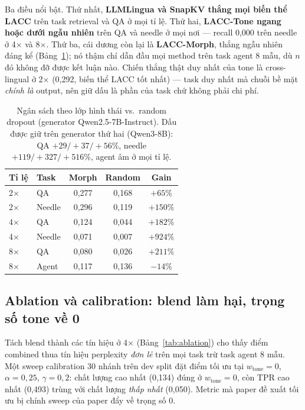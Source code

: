 \documentclass[runningheads]{llncs}
\newcommand{\method}[1]{\textsc{#1}}
\begin{document}
Ba điều nổi bật. Thứ nhất, \textbf{LLMLingua và SnapKV thắng mọi biến thể \method{LACC}} trên task retrieval và QA ở mọi tỉ lệ. Thứ hai, \textbf{LACC-Tone ngang hoặc dưới ngẫu nhiên} trên QA và needle ở mọi nơi --- recall 0,000 trên needle ở 4$\times$ và 8$\times$. Thứ ba, cái dương còn lại là \textbf{LACC-Morph}, thắng ngẫu nhiên đáng kể (Bảng~\ref{tab:morph}); nó thậm chí dẫn đầu mọi method trên task agent 8 mẫu, dù $n$ đó không đỡ được kết luận nào. Chiến thắng thật duy nhất của tone là cross-lingual ở 2$\times$ (0,292, biến thể \method{LACC} tốt nhất) --- task duy nhất mà chuỗi bề mặt \emph{chính là} output, nên giữ dấu là phần của task chứ không phải chi phí.

\begin{table}[H]
\centering
\caption{Ngân sách theo lớp hình thái vs.\ random dropout (generator Qwen2.5-7B-Instruct). Dấu được giữ trên generator thứ hai (Qwen3-8B): QA $+29/+37/+56\%$, needle $+119/+327/+516\%$, agent âm ở mọi tỉ lệ.}
\label{tab:morph}
\begin{tabular}{llccc}
\toprule
\textbf{Tỉ lệ} & \textbf{Task} & \textbf{Morph} & \textbf{Random} & \textbf{Gain} \\
\midrule
2$\times$ & QA     & 0,277 & 0,168 & \textbf{$+65\%$} \\
2$\times$ & Needle & 0,296 & 0,119 & \textbf{$+150\%$} \\
4$\times$ & QA     & 0,124 & 0,044 & \textbf{$+182\%$} \\
4$\times$ & Needle & 0,071 & 0,007 & $+924\%$ \\
8$\times$ & QA     & 0,080 & 0,026 & $+211\%$ \\
8$\times$ & Agent  & 0,117 & 0,136 & $-14\%$ \\
\bottomrule
\end{tabular}
\end{table}

\subsection{Ablation và calibration: blend làm hại, trọng số tone về 0}

Tách blend thành các tín hiệu ở 4$\times$ (Bảng~\ref{tab:ablation}) cho thấy điểm combined thua tín hiệu perplexity \emph{đơn lẻ} trên mọi task trừ task agent 8 mẫu. Một sweep calibration 30 nhánh trên dev split đặt điểm tối ưu tại $w_{\text{tone}}{=}0$, $\alpha{=}0{,}25$, $\gamma{=}0{,}2$: chất lượng cao nhất (0,134) đúng ở $w_{\text{tone}}{=}0$, còn TPR cao nhất (0,493) trùng với chất lượng \emph{thấp nhất} (0,050). Metric mà paper đề xuất tối ưu bị chính sweep của paper đẩy về trọng số 0.
\end{document}
